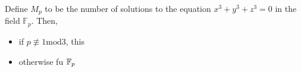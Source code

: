 
\begin{theorem}
Define $M_p$ to be the number of solutions to the equation $x^3 + y^3 + z^3 = 0$ in the field $\mathbb{F}_p$. Then,
\begin{itemize}
\item if $p \not\equiv 1 \text{mod} 3$, this
\item otherwise fu $\mathbb{F}_p$
\end{itemize}
\end{theorem}
